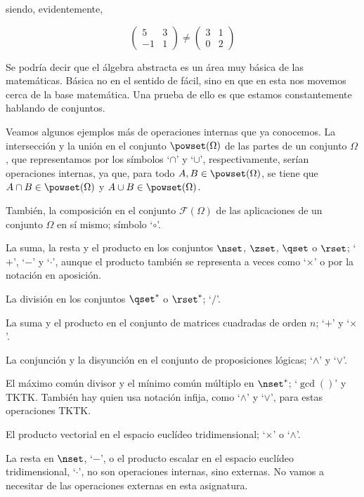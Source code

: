 \noindent siendo, evidentemente,

$$
  \begin{pmatrix}
  5 & 3 \\
  -1 & 1
  \end{pmatrix}
  \neq
  \begin{pmatrix}
  3 & 1 \\
  0 & 2
  \end{pmatrix}
$$

Se podría decir que el álgebra abstracta es un área muy básica de las
matemáticas. Básica no en el sentido de fácil, sino en que en esta nos
movemos cerca de la base matemática. Una prueba de ello es que estamos
constantemente hablando de conjuntos.

Veamos algunos ejemplos más de operaciones internas que ya conocemos. La
intersección y la unión en el conjunto $\powset(\Omega)$ de las partes de un
conjunto $\Omega$, que representamos por los símbolos `$\cap$' y `$\cup$',
respectivamente, serían operaciones internas, ya que, para todo $A, B \in
\powset(\Omega)$, se tiene que $A \cap B \in \powset(\Omega)$ y $A \cup B
\in \powset(\Omega)$.

También, la composición en el conjunto $\mathcal{F}(\Omega)$ de las
aplicaciones de un conjunto $\Omega$ en sí mismo; símbolo `$\circ$'.

La suma, la resta y el producto en los conjuntos $\nset$, $\zset$, $\qset$ o
$\rset$; `$+$', `$-$' y `$\cdot$', aunque el producto también se representa
a veces como `$\times$' o por la notación en aposición.

La división en los conjuntos $\qset^*$ o $\rset^*$; `$/$'.

La suma y el producto en el conjunto de matrices cuadradas de orden $n$;
`$+$' y `$\times$'.

La conjunción y la disyunción en el conjunto de proposiciones lógicas;
`$\land$' y `$\lor$'.

El máximo común divisor y el mínimo común múltiplo en $\nset^*$; `$\gcd()$'
y TKTK. También hay quien usa notación infija, como `$\land$' y `$\lor$',
para estas operaciones TKTK.

El producto vectorial en el espacio euclídeo tridimensional; `$\times$' o
`$\wedge$'.

La resta en $\nset$, `$-$', o el producto escalar en el espacio euclídeo
tridimensional, `$\cdot$', no son operaciones internas, sino externas. No
vamos a necesitar de las operaciones externas en esta asignatura.






